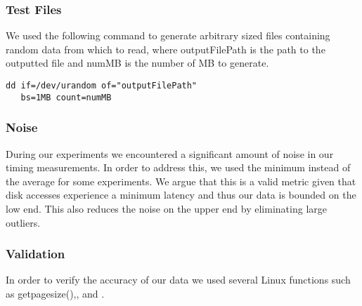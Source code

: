 \subsubsection{Test Files}
We used the following command to generate arbitrary sized files containing random
data from which to read, where outputFilePath is the path to the outputted file and numMB is the number of MB to generate.

\begin{verbatim}
dd if=/dev/urandom of="outputFilePath" 
   bs=1MB count=numMB
\end{verbatim}

\subsubsection{Noise}
During our experiments we encountered a significant amount of noise in our timing measurements. In order to address this, we used the minimum instead of the average for some experiments. We argue that this is a valid metric given that disk accesses experience a minimum latency and thus our data is bounded on the low end. This also reduces the noise on the upper end by eliminating large outliers.

\subsubsection{Validation}
In order to verify the accuracy of our data we used several Linux functions such as
getpagesize(),, and .

